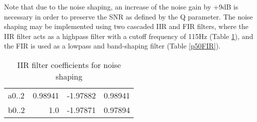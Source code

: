 Note that due to the noise shaping, an increase of the noise gain by +9dB is necessary in order to preserve the SNR as
defined by the Q parameter.
The noise shaping may be implemented using two cascaded IIR and FIR filters, where the IIR filter acts as a highpass
filter with a cutoff frequency of 115Hz (Table \ref{p50IIR}), and the FIR is used as a lowpass and band-shaping filter
(Table \ref{p50FIR}).

\begin{table}
    \centering
    \begin{tabular}{lrrr}
        a0..2 & 0.98941 & -1.97882 & 0.98941 \\
        b0..2 & 1.0 & -1.97871 & 0.97894 \\

    \end{tabular}
    \caption{IIR filter coefficients for noise shaping}
    \label{p50IIR}
\end{table}


